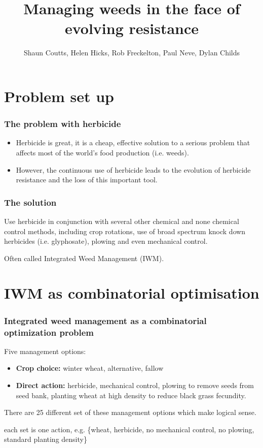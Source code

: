 \documentclass[]{beamer}
\title{Managing weeds in the face of evolving resistance}    %
\author{Shaun Coutts, Helen Hicks, Rob Freckelton, Paul Neve, Dylan Childs}    %
\institute{Animal and Plant Science, University of Sheffield}    %
\begin{document}
\begin{frame}
  \titlepage
\end{frame}

\section{Problem set up}
  \begin{frame}
  \frametitle{The problem with herbicide}   %
    \begin{itemize}
	  \item Herbicide is great, it is a cheap, effective solution to a serious problem that affects most of the world's food production (i.e. weeds).
	  \item However, the continuous use of herbicide leads to the evolution of herbicide resistance and the loss of this important tool.    
	\end{itemize}
  \end{frame}
  
  \begin{frame}
  \frametitle{The solution}
    Use herbicide in conjunction with several other chemical and none chemical control methods, including crop rotations, use of broad spectrum knock down herbicides (i.e. glyphosate), plowing and even mechanical control.
    
    Often called Integrated Weed Management (IWM).        
  \end{frame}

\section{IWM as combinatorial optimisation}  
  \begin{frame}
    \frametitle{Integrated weed management as a combinatorial optimization problem}
    Five management options:
    \begin{itemize}
      \item \textbf{Crop choice:} winter wheat, alternative, fallow
      \item \textbf{Direct action:} herbicide, mechanical control, plowing to remove seeds from seed bank, planting wheat at high density to reduce black grass fecundity.  
    \end{itemize}       
    
    There are 25 different set of these management options which make logical sense.
    
    each set is one action, e.g. \{wheat, herbicide, no mechanical control, no plowing, standard planting density\}  
  \end{frame}
  
\end{document}

